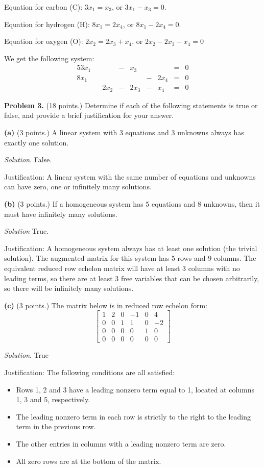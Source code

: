 \documentclass[12pt]{article}
\begin{document}
Equation for carbon (C): $3x_1=x_3$, or $3x_1-x_3=0$.

Equation for hydrogen (H): $8x_1=2x_4$, or $8x_1-2x_4=0$.

Equation for oxygen (O): $2x_2=2x_3+x_4$, or $2x_2-2x_3-x_4=0$

We get the following system:
\begin{alignat*}{5}
3x_1 & {}{} &      & {}-{} &  x_3 & {}{}  &  & {}={} & 0\\
8x_1 & {}{} &      & {}{}  &      & {}-{} & 2x_4 & {}={} & 0\\
     & {}{} & 2x_2 & {}-{} & 2x_3 & {}-{} &  x_4 & {}={} & 0
\end{alignat*}

\textbf{Problem 3.} (18 points.) Determine if each of the following statements is true or false, and provide a brief justification for your answer.

\textbf{(a)} (3 points.) A linear system with 3 equations and 3 unknowns always has exactly one solution.

\emph{Solution}. False.

Justification: A linear system with the same number of equations and unknowns can have zero, one or infinitely many solutions.

\textbf{(b)} (3 points.) If a homogeneous system has 5 equations and 8 unknowns, then it must have infinitely many solutions.

\emph{Solution} True.

Justification: A homogeneous system always has at least one solution (the trivial solution). The augmented matrix for this system has 5 rows and 9 columns. The equivalent reduced row echelon matrix will have at least 3 columns with no leading terms, so there are at least 3 free variables that can be chosen arbitrarily, so there will be infinitely many solutions.

\textbf{(c)} (3 points.) The matrix below is in reduced row echelon form:
\[
\left[
\begin{matrix}
1 & 2 & 0 & -1 & 0 & 4\\
0 & 0 & 1 &  1 & 0 & -2\\
0 & 0 & 0 & 0 & 1 & 0 \\
0 & 0 & 0 & 0 & 0 & 0
\end{matrix}
\right]
\]

\emph{Solution}. True

Justification: The following conditions are all satisfied:
\begin{itemize}
\item Rows 1, 2 and 3 have a leading nonzero term equal to 1, located at columns 1, 3 and 5, respectively.
\item The leading nonzero term in each row is strictly to the right to the leading term in the previous row.
\item The other entries in columns with a leading nonzero term are zero.
\item All zero rows are at the bottom of the matrix.
\end{itemize}
\end{document}
